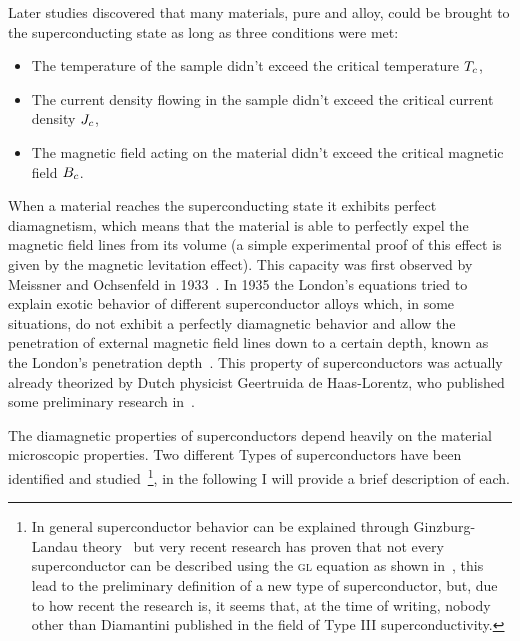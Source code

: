 Later studies discovered that many materials, pure and alloy, could be brought to the
superconducting state as long as three conditions were met:
\begin{itemize}
	\item The temperature of the sample didn't exceed the critical temperature $T_c$,
	\item The current density flowing in the sample didn't exceed the critical current
	      density $J_c$,
	\item The magnetic field acting on the material didn't exceed the critical magnetic field $B_c$.
\end{itemize}

When a material reaches the superconducting state it exhibits perfect diamagnetism, which means that
the material is able to perfectly expel the magnetic field lines from its volume (a simple experimental proof of this effect
is given by the magnetic levitation effect). This capacity was first observed by
Meissner and Ochsenfeld in 1933~\cite{meissner1933}. In 1935 the London's equations tried to explain
exotic behavior of different superconductor alloys which, in some situations, do not exhibit a perfectly diamagnetic behavior and allow the
penetration of external magnetic field lines down to a certain depth, known as the London's
penetration depth~\cite{london1935}. This property of superconductors was actually already theorized by Dutch
physicist Geertruida de Haas-Lorentz, who published some preliminary research in~\cite{fokker1925physica}.

The diamagnetic properties of superconductors depend heavily on the material microscopic properties. Two different Types of superconductors have been
identified and studied~\footnote{
	In general superconductor behavior can be explained through
	Ginzburg-Landau theory~\cite{Cyrot1973} but very recent research has proven that not every
	superconductor can be described using the \textsc{gl} equation as shown
	in~\cite{diamantini2023typeiiisuperconductivity}, this lead to the preliminary definition of
	a new type of superconductor, but, due to how recent the research is, it seems that, at the
	time of writing, nobody other than Diamantini published in the field of Type III superconductivity.
}, in the following I will provide a brief description of each.

